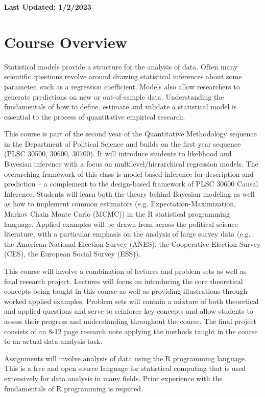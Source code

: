 \documentclass[11pt, article, oneside]{memoir}
\title{{\mytitle}}
\author{\myauthor\smallskip\footnotesize\newline Office: Pick Hall 328, 3rd floor
  \newline Office Hours: Tuesdays 4pm-6pm or schedule an appointment by e-mail \newline
    \myemail \newline \mywebsite
\newline
}
\date{}
\theoremstyle{Assumption}
\begin{document}
\maketitle
\textbf{Last Updated: 1/2/2023}
\section*{Course Overview}

Statistical models provide a structure for the analysis of data. Often many scientific questions revolve around drawing statistical inferences about some parameter, such as a regression coefficient. Models also allow researchers to generate predictions on new or out-of-sample data. Understanding the fundamentals of how to define, estimate and validate a statistical model is essential to the process of quantitative empirical research.

This course is part of the second year of the Quantitative Methodology sequence in the Department of Political Science and builds on the first year sequence (PLSC 30500, 30600, 30700). It will introduce students to likelihood and Bayesian inference with a focus on multilevel/hierarchical regression models. The overarching framework of this class is model-based inference for description and prediction -- a complement to the design-based framework of PLSC 30600 Causal Inference. Students will learn both the theory behind Bayesian modeling as well as how to implement common estimators (e.g. Expectation-Maximization, Markov Chain Monte Carlo (MCMC)) in the R statistical programming language. Applied examples will be drawn from across the political science literature, with a particular emphasis on the analysis of large survey data (e.g. the American National Election Survey (ANES), the Cooperative Election Survey (CES), the European Social Survey (ESS)).

This course will involve a combination of lectures and problem sets as well as final research project. Lectures will focus on introducing the core theoretical concepts being taught in this course as well as providing illustrations through worked applied examples. Problem sets will contain a mixture of both theoretical and applied questions and serve to reinforce key concepts and allow students to assess their progress and understanding throughout the course. The final project consists of an 8-12 page research note applying the methods taught in the course to an actual data analysis task. 

Assignments will involve analysis of data using the R programming language. This is a free and open source language for statistical computing that is used extensively for data analysis in many fields. Prior experience with the fundamentals of R programming is required.
\end{document}
